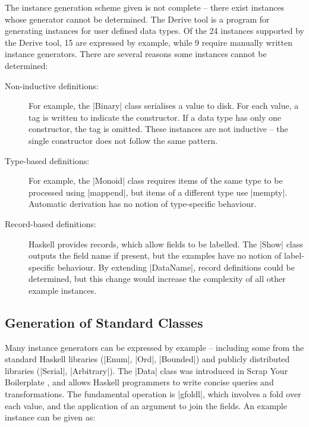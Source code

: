 \documentclass[preprint]{sigplanconf}
\begin{document}
The instance generation scheme given is not complete -- there exist instances whose generator cannot be determined. The Derive tool \cite{derive} is a program for generating instances for user defined data types. Of the 24 instances supported by the Derive tool, 15 are expressed by example, while 9 require manually written instance generators. There are several reasons some instances cannot be determined:

\begin{description}

\item[Non-inductive definitions:] For example, the |Binary| class serialises a value to disk. For each value, a tag is written to indicate the constructor. If a data type has only one constructor, the tag is omitted. These instances are not inductive -- the single constructor does not follow the same pattern.

\item[Type-based definitions:] For example, the |Monoid| class requires items of the same type to be processed using |mappend|, but items of a different type use |mempty|. Automatic derivation has no notion of type-specific behaviour.

\item [Record-based definitions:] Haskell provides records, which allow fields to be labelled. The |Show| class outputs the field name if present, but the examples have no notion of label-specific behaviour. By extending |DataName|, record definitions could be determined, but this change would increase the complexity of all other example instances.

\end{description}

\subsection{Generation of Standard Classes}
\label{sec:automatic_success}

Many instance generators can be expressed by example -- including some from the standard Haskell libraries (|Enum|, |Ord|, |Bounded|) and publicly distributed libraries (|Serial|, |Arbitrary|). The |Data| class was introduced in Scrap Your Boilerplate \cite{lammel:syb}, and allows Haskell programmers to write concise queries and transformations. The fundamental operation is |gfoldl|, which involves a fold over each value, and the application of an argument to join the fields. An example instance can be given as:
\end{document}

